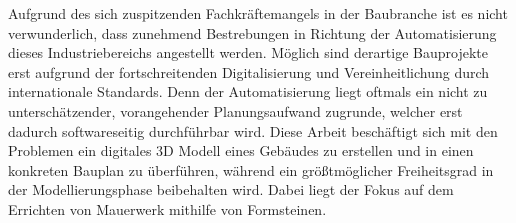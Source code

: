 Aufgrund des sich zuspitzenden Fachkräftemangels in der Baubranche ist es nicht verwunderlich, dass zunehmend Bestrebungen in Richtung der Automatisierung dieses Industriebereichs angestellt werden.
Möglich sind derartige Bauprojekte erst aufgrund der fortschreitenden Digitalisierung und Vereinheitlichung durch internationale Standards.
Denn der Automatisierung liegt oftmals ein nicht zu unterschätzender, vorangehender Planungsaufwand zugrunde, welcher erst dadurch softwareseitig durchführbar wird.
Diese Arbeit beschäftigt sich mit den Problemen ein digitales 3D Modell eines Gebäudes zu erstellen und in einen konkreten Bauplan zu überführen, während ein größtmöglicher Freiheitsgrad in der Modellierungsphase beibehalten wird.
Dabei liegt der Fokus auf dem Errichten von Mauerwerk mithilfe von Formsteinen.